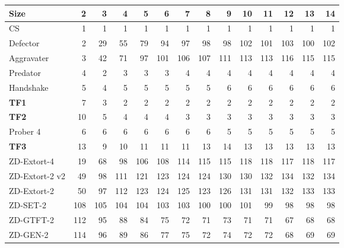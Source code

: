 \begin{tabular}{lrrrrrrrrrrrrr}
\toprule
           Size &      2 &      3 &      4 &      5 &      6 &      7 &      8 &      9 &     10 &     11 &     12 &     13 &     14 \\
\midrule
             CS &    1 &    1 &    1 &    1 &    1 &    1 &    1 &    1 &    1 &    1 &    1 &    1 &    1 \\
       Defector &    2 &   29 &   55 &   79 &   94 &   97 &   98 &   98 &  102 &  101 &  103 &  100 &  102 \\
     Aggravater &    3 &   42 &   71 &   97 &  101 &  106 &  107 &  111 &  113 &  113 &  116 &  115 &  115 \\
       Predator &    4 &    2 &    3 &    3 &    3 &    4 &    4 &    4 &    4 &    4 &    4 &    4 &    4 \\
      Handshake &    5 &    4 &    5 &    5 &    5 &    5 &    5 &    6 &    6 &    6 &    6 &    6 &    6 \\
\midrule
            \textbf{TF1} &    7 &    3 &    2 &    2 &    2 &    2 &    2 &    2 &    2 &    2 &    2 &    2 &    2 \\
            \textbf{TF2} &   10 &    5 &    4 &    4 &    4 &    3 &    3 &    3 &    3 &    3 &    3 &    3 &    3 \\
       Prober 4 &    6 &    6 &    6 &    6 &    6 &    6 &    6 &    5 &    5 &    5 &    5 &    5 &    5 \\
\midrule
            \textbf{TF3} &   13 &    9 &   10 &   11 &   11 &   11 &   13 &   14 &   13 &   13 &   13 &   13 &   13 \\
\midrule
    ZD-Extort-4 &   19 &   68 &   98 &  106 &  108 &  114 &  115 &  115 &  118 &  118 &  117 &  118 &  117 \\
 ZD-Extort-2 v2 &   49 &   98 &  111 &  121 &  123 &  124 &  124 &  130 &  130 &  132 &  134 &  132 &  134 \\
    ZD-Extort-2 &   50 &   97 &  112 &  123 &  124 &  125 &  123 &  126 &  131 &  131 &  132 &  133 &  133 \\
       ZD-SET-2 &  108 &  105 &  104 &  104 &  103 &  103 &  100 &  100 &  101 &   99 &   98 &   98 &   98 \\
      ZD-GTFT-2 &  112 &   95 &   88 &   84 &   75 &   72 &   71 &   73 &   71 &   71 &   67 &   68 &   68 \\
       ZD-GEN-2 &  114 &   96 &   89 &   86 &   77 &   75 &   72 &   74 &   72 &   72 &   68 &   69 &   69 \\
\bottomrule
\end{tabular}